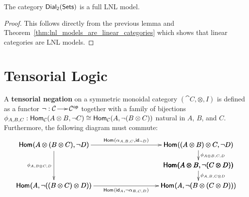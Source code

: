 \begin{corollary}
  \label{corollary:dial-FLNL}
  The category $\mathsf{Dial_2}(\mathsf{Sets})$ is a full LNL model.
\end{corollary}
\begin{proof}
  This follows directly from the previous lemma and
  Theorem~\ref{thm:lnl_models_are_linear_categories} which shows that
  linear categories are LNL models.
\end{proof}


\section{Tensorial Logic}
\label{sec:tensorial_logic}

\begin{definition}
  \label{def:tensorial-negation}
  A \textbf{tensorial negation} on a symmetric monoidal category
  $(\cat{C},\otimes,I)$ is defined as a functor $\lnot : \mathcal{C} \to
  \mathcal{C}^{\mathsf{op}}$ together with a family of bijections $\phi_{A,B,C} :
  \mathsf{Hom}_{\mathcal{C}}(A \otimes B,\lnot C) \cong \mathsf{Hom}_{\mathcal{C}}(A,\lnot (B \otimes C))$
  natural in $A$, $B$, and $C$.  Furthermore, the following
  diagram must commute:
  \[
  \bfig
  \morphism(0,85)|l|/<-/<0,480>[`;\phi_{A,B \otimes C,D}]
  \vSquares/->``->```->`->/<300,300>%
              [\homs{}{A \otimes (B \otimes C)}{\lnot D}`%
                \homs{}{(A \otimes B) \otimes C}{\lnot D}``%
                \homs{}{A \otimes B}{\lnot (C \otimes D)}`%
                \homs{}{A}{\lnot ((B \otimes C) \otimes D)}`%
                \homs{}{A}{\lnot (B \otimes (C \otimes D))};%
                \homs{}{\alpha_{A,B,C}}{\id_{\lnot D}}``%
                \phi_{A \otimes B,C,D}```%
                \phi_{A,B,C \otimes D}`%
                \homs{}{\id_{A}}{\lnot \alpha_{B,C,D}}]
  \efig
  \]
\end{definition}

